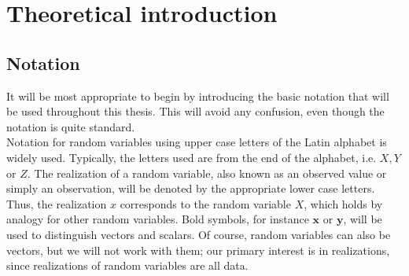 \chapter{Theoretical introduction}

\section{Notation}\label{sec:terminology}
It will be most appropriate to begin by introducing the basic notation that will be used throughout this thesis. This will avoid any confusion, even though the notation is quite standard. \\
Notation for random variables using upper case letters of the Latin alphabet is widely used. Typically, the letters used are from the end of the alphabet, i.e. $X,Y$ or $Z$. The realization of a random variable, also known as an observed value or simply an observation, will be denoted by the appropriate lower case letters. Thus, the realization  $x$ corresponds to the random variable $X$, which holds by analogy for other random variables. Bold symbols, for instance $\boldsymbol{x}$ or $\boldsymbol{y}$, will be used to distinguish vectors and scalars. Of course, random variables can also be vectors, but we will not work with them; our primary interest is in realizations, since realizations of random variables are all data. \\



